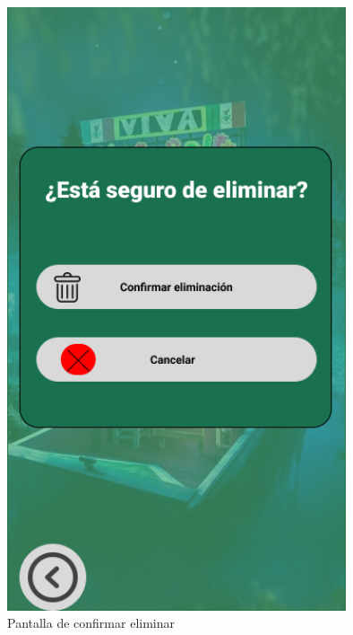 \begin{figure}[htb]
    \centering
    \includegraphics[width=10cm]{pantalla13.jpg}
    \caption{Pantalla de confirmar eliminar}
    \label{fig:enter-label}
\end{figure}


